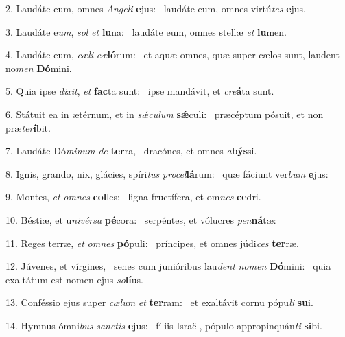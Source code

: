 2. Laudáte eum, omnes \textit{An}\textit{ge}\textit{li} \textbf{e}jus: \ast\  laudáte eum, omnes virtú\textit{tes} \textbf{e}jus.\

3. Laudáte e\textit{um}, \textit{sol} \textit{et} \textbf{lu}na: \ast\  laudáte eum, omnes stellæ \textit{et} \textbf{lu}men.\

4. Laudáte eum, \textit{cæ}\textit{li} \textit{cæ}\textbf{ló}rum: \ast\  et aquæ omnes, quæ super cælos sunt, laudent no\textit{men} \textbf{Dó}mini.\

5. Quia ipse \textit{di}\textit{xit}, \textit{et} \textbf{fac}ta sunt: \ast\  ipse mandávit, et \textit{cre}\textbf{á}ta sunt.\

6. Státuit ea in ætérnum, et in \textit{sǽ}\textit{cu}\textit{lum} \textbf{sǽ}culi: \ast\  præcéptum pósuit, et non præ\textit{ter}\textbf{í}bit.\

7. Laudáte Dó\textit{mi}\textit{num} \textit{de} \textbf{ter}ra, \ast\  dracónes, et omnes \textit{a}\textbf{býs}si.\

8. Ignis, grando, nix, glácies, spíri\textit{tus} \textit{pro}\textit{cel}\textbf{lá}rum: \ast\  quæ fáciunt ver\textit{bum} \textbf{e}jus:\

9. Montes, \textit{et} \textit{om}\textit{nes} \textbf{col}les: \ast\  ligna fructífera, et om\textit{nes} \textbf{ce}dri.\

10. Béstiæ, et u\textit{ni}\textit{vér}\textit{sa} \textbf{pé}cora: \ast\  serpéntes, et vólucres \textit{pen}\textbf{ná}tæ:\

11. Reges terræ, \textit{et} \textit{om}\textit{nes} \textbf{pó}puli: \ast\  príncipes, et omnes júdi\textit{ces} \textbf{ter}ræ.\

12. Júvenes, et vírgines, \dag\  senes cum junióribus lau\textit{dent} \textit{no}\textit{men} \textbf{Dó}mini: \ast\  quia exaltátum est nomen ejus \textit{so}\textbf{lí}us.\

13. Conféssio ejus super \textit{cæ}\textit{lum} \textit{et} \textbf{ter}ram: \ast\  et exaltávit cornu pópu\textit{li} \textbf{su}i.\

14. Hymnus ómni\textit{bus} \textit{sanc}\textit{tis} \textbf{e}jus: \ast\  fíliis Israël, pópulo appropinquán\textit{ti} \textbf{si}bi.\

